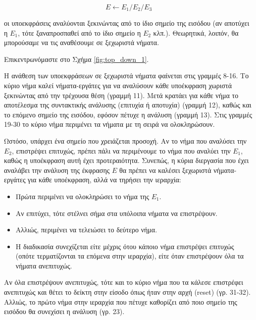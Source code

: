 \begin{equation}
	E \leftarrow E_1 / E_2 /  E_3
\end{equation}

οι υποεκφράσεις αναλύονται ξεκινώντας από το ίδιο σημείο της εισόδου (αν αποτύχει η $E_1$, τότε ξαναπροσπαθεί από το ίδιο σημείο η $E_2$ κλπ.).
Θεωρητικά, λοιπόν, θα μπορούσαμε να τις αναθέσουμε σε ξεχωριστά νήματα.

Επικεντρωνόμαστε στο Σχήμα \ref{fig:top_down_1}.

Η ανάθεση των υποεκφράσεων σε ξεχωριστά νήματα φαίνεται στις γραμμές 8-16.
Το κύριο νήμα καλεί νήματα-εργάτες για να αναλύσουν κάθε υποέκφραση χωριστά ξεκινώντας από την τρέχουσα θέση (γραμμή 11).
Μετά κρατάει για κάθε νήμα το αποτέλεσμα της συντακτικής ανάλυσης (επιτυχία ή αποτυχία) (γραμμή 12), καθώς και το επόμενο σημείο της εισόδου, εφόσον πέτυχε η ανάλυση (γραμμή 13).
Στις γραμμές 19-30 το κύριο νήμα περιμένει τα νήματα με τη σειρά να ολοκληρώσουν.

Ωστόσο, υπάρχει ένα σημείο που χρειάζεται προσοχή.
Αν το νήμα που αναλύσει την $E_2$, επιστρέψει επιτυχώς, πρέπει πάλι να περιμένουμε το νήμα που αναλύει την $E_1$, καθώς η υποέκφραση αυτή έχει προτεραιότητα.
Συνεπώς, η κύρια διεργασία που έχει αναλάβει την ανάλυση της έκφρασης $E$ θα πρέπει να καλέσει ξεχωριστά νήματα-εργάτες για κάθε υποέκφραση, αλλά να τηρήσει την ιεραρχία:

\begin{itemize}
	\item Πρώτα περιμένει να ολοκληρώσει το νήμα της $E_1$.
	\item Αν επιτύχει, τότε στέλνει σήμα στα υπόλοιπα νήματα να επιστρέψουν.
	\item Αλλιώς, περιμένει να τελειώσει το δεύτερο νήμα.
	\item Η διαδικασία συνεχίζεται είτε μέχρις ότου κάποιο νήμα επιστρέψει επιτυχώς (οπότε τερματίζονται τα 
	  επόμενα στην ιεραρχία), είτε όταν επιστρέψουν όλα τα νήματα ανεπιτυχώς. 
\end{itemize}

Αν όλα επιστρέψουν ανεπιτυχώς, τότε και το κύριο νήμα που τα κάλεσε επιστρέφει ανεπιτυχώς και θέτει το δείκτη στην είσοδο όπως ήταν στην αρχή (reset) (γρ. 31-32).
Αλλιώς, το πρώτο νήμα στην ιεραρχία που πέτυχε καθορίζει από ποιο σημείο της εισόδου θα συνεχίσει η ανάλυση (γρ. 23).

